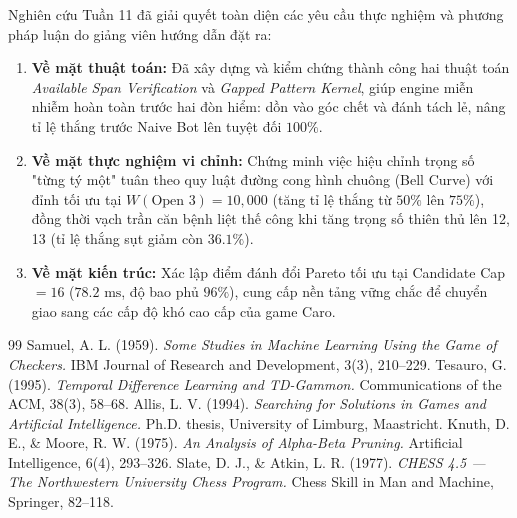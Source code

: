 \documentclass[11pt,a4paper]{article}
\begin{document}
Nghiên cứu Tuần 11 đã giải quyết toàn diện các yêu cầu thực nghiệm và phương pháp luận do giảng viên hướng dẫn đặt ra:
\begin{enumerate}
    \item \textbf{Về mặt thuật toán:} Đã xây dựng và kiểm chứng thành công hai thuật toán \textit{Available Span Verification} và \textit{Gapped Pattern Kernel}, giúp engine miễn nhiễm hoàn toàn trước hai đòn hiểm: dồn vào góc chết và đánh tách lẻ, nâng tỉ lệ thắng trước Naive Bot lên tuyệt đối $100\%$.
    \item \textbf{Về mặt thực nghiệm vi chỉnh:} Chứng minh việc hiệu chỉnh trọng số "từng tý một" tuân theo quy luật đường cong hình chuông (Bell Curve) với đỉnh tối ưu tại $W(\text{Open 3}) = 10{,}000$ (tăng tỉ lệ thắng từ $50\%$ lên $75\%$), đồng thời vạch trần căn bệnh liệt thế công khi tăng trọng số thiên thủ lên 12, 13 (tỉ lệ thắng sụt giảm còn $36.1\%$).
    \item \textbf{Về mặt kiến trúc:} Xác lập điểm đánh đổi Pareto tối ưu tại Candidate Cap $= 16$ ($78.2\text{ ms}$, độ bao phủ $96\%$), cung cấp nền tảng vững chắc để chuyển giao sang các cấp độ khó cao cấp của game Caro.
\end{enumerate}

\begin{thebibliography}{99}
 Samuel, A. L. (1959). \textit{Some Studies in Machine Learning Using the Game of Checkers.} IBM Journal of Research and Development, 3(3), 210--229.
 Tesauro, G. (1995). \textit{Temporal Difference Learning and TD-Gammon.} Communications of the ACM, 38(3), 58--68.
 Allis, L. V. (1994). \textit{Searching for Solutions in Games and Artificial Intelligence.} Ph.D. thesis, University of Limburg, Maastricht.
 Knuth, D. E., \& Moore, R. W. (1975). \textit{An Analysis of Alpha-Beta Pruning.} Artificial Intelligence, 6(4), 293--326.
 Slate, D. J., \& Atkin, L. R. (1977). \textit{CHESS 4.5 --- The Northwestern University Chess Program.} Chess Skill in Man and Machine, Springer, 82--118.
\end{thebibliography}
\end{document}
